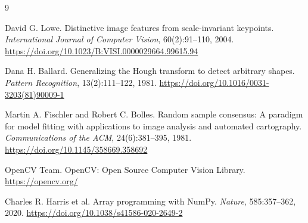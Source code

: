 \documentclass[11pt,a4paper]{article}
\begin{document}
\clearpage
\begin{thebibliography}{9}

David G. Lowe.
\newblock Distinctive image features from scale-invariant keypoints.
\newblock \emph{International Journal of Computer Vision}, 60(2):91--110, 2004.
\newblock \url{https://doi.org/10.1023/B:VISI.0000029664.99615.94}

Dana H. Ballard.
\newblock Generalizing the Hough transform to detect arbitrary shapes.
\newblock \emph{Pattern Recognition}, 13(2):111--122, 1981.
\newblock \url{https://doi.org/10.1016/0031-3203(81)90009-1}

Martin A. Fischler and Robert C. Bolles.
\newblock Random sample consensus: A paradigm for model fitting with applications to image analysis and automated cartography.
\newblock \emph{Communications of the ACM}, 24(6):381--395, 1981.
\newblock \url{https://doi.org/10.1145/358669.358692}

OpenCV Team.
\newblock OpenCV: Open Source Computer Vision Library.
\newblock \url{https://opencv.org/}

Charles R. Harris et al.
\newblock Array programming with NumPy.
\newblock \emph{Nature}, 585:357--362, 2020.
\newblock \url{https://doi.org/10.1038/s41586-020-2649-2}

\end{thebibliography}
\end{document}
